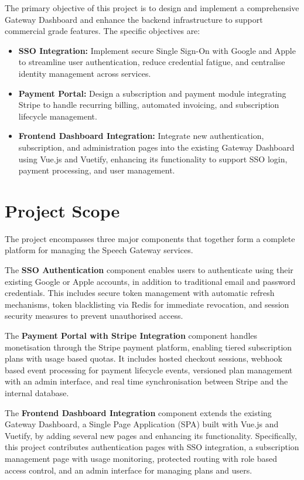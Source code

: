 The primary objective of this project is to design and implement a comprehensive Gateway Dashboard and enhance the backend infrastructure to support commercial grade features. The specific objectives are:

\begin{itemize}
    \item \textbf{SSO Integration:} Implement secure Single Sign-On with Google and Apple to streamline user authentication, reduce credential fatigue, and centralise identity management across services.

    \item \textbf{Payment Portal:} Design a subscription and payment module integrating Stripe to handle recurring billing, automated invoicing, and subscription lifecycle management.

    \item \textbf{Frontend Dashboard Integration:} Integrate new authentication, subscription, and administration pages into the existing Gateway Dashboard using Vue.js and Vuetify, enhancing its functionality to support SSO login, payment processing, and user management.
\end{itemize}

\section{Project Scope}

The project encompasses three major components that together form a complete platform for managing the Speech Gateway services.

The \textbf{SSO Authentication} component enables users to authenticate using their existing Google or Apple accounts, in addition to traditional email and password credentials. This includes secure token management with automatic refresh mechanisms, token blacklisting via Redis for immediate revocation, and session security measures to prevent unauthorised access.

The \textbf{Payment Portal with Stripe Integration} component handles monetisation through the Stripe payment platform, enabling tiered subscription plans with usage based quotas. It includes hosted checkout sessions, webhook based event processing for payment lifecycle events, versioned plan management with an admin interface, and real time synchronisation between Stripe and the internal database.

The \textbf{Frontend Dashboard Integration} component extends the existing Gateway Dashboard, a Single Page Application (SPA) built with Vue.js and Vuetify, by adding several new pages and enhancing its functionality. Specifically, this project contributes authentication pages with SSO integration, a subscription management page with usage monitoring, protected routing with role based access control, and an admin interface for managing plans and users.

